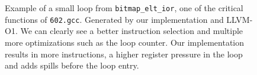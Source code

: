 \begin{figure}
\begin{tikzpicture}
\end{tikzpicture}
\caption{Example of a small loop from \texttt{bitmap\_elt\_ior}, one of the critical functions of \texttt{602.gcc}. Generated by our implementation and LLVM-O1. We can clearly see a better instruction selection and multiple more optimizations such as the loop counter. Our implementation results in more instructions, a higher register pressure in the loop and adds spills before the loop entry.}
\label{fig:asm}
\end{figure}